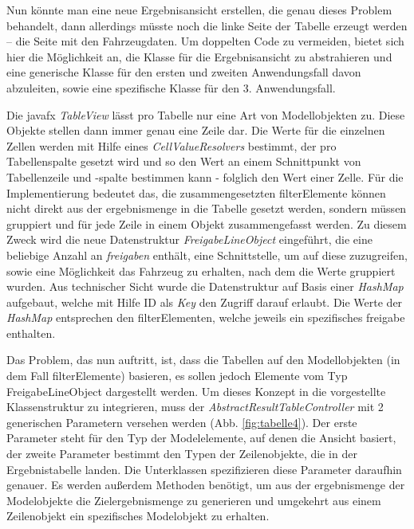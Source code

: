 Nun könnte man eine neue Ergebnisansicht erstellen, die genau dieses Problem behandelt, dann allerdings müsste noch die linke Seite der Tabelle erzeugt werden – die Seite mit den Fahrzeugdaten. Um doppelten Code zu vermeiden, bietet sich hier die Möglichkeit an, die Klasse für die Ergebnisansicht zu abstrahieren und eine generische Klasse für den ersten und zweiten Anwendungsfall davon abzuleiten, sowie eine spezifische Klasse für den 3. Anwendungsfall.

Die \gls{javafx} \textit{TableView} lässt pro Tabelle nur eine Art von Modellobjekten zu. Diese Objekte stellen dann immer genau eine Zeile dar. Die Werte für die einzelnen Zellen werden mit Hilfe eines \textit{CellValueResolvers} bestimmt, der pro Tabellenspalte gesetzt wird und so den Wert an einem Schnittpunkt von Tabellenzeile und -spalte bestimmen kann - folglich den Wert einer Zelle. Für die Implementierung bedeutet das, die zusammengesetzten \gls{filterElement}e können nicht direkt aus der \gls{ergebnismenge} in die Tabelle gesetzt werden, sondern müssen gruppiert und für jede Zeile in einem Objekt zusammengefasst werden. Zu diesem Zweck wird die neue Datenstruktur \textit{FreigabeLineObject} eingeführt, die eine beliebige Anzahl an \textit{\gls{freigabe}n} enthält, eine Schnittstelle, um auf diese zuzugreifen, sowie eine Möglichkeit das Fahrzeug zu erhalten, nach dem die Werte gruppiert wurden. Aus technischer Sicht wurde die Datenstruktur auf Basis einer \textit{HashMap} aufgebaut, welche mit Hilfe ID als \textit{Key} den Zugriff darauf erlaubt. Die Werte der \textit{HashMap} entsprechen den \gls{filterElement}en, welche jeweils ein spezifisches \gls{freigabe} enthalten.

Das Problem, das nun auftritt, ist, dass die Tabellen auf den Modellobjekten (in dem Fall \gls{filterElement}e) basieren, es sollen jedoch Elemente vom Typ FreigabeLineObject dargestellt werden. Um dieses Konzept in die vorgestellte Klassenstruktur zu integrieren, muss der \textit{AbstractResultTableController} mit 2 generischen Parametern versehen werden (Abb. \ref{fig:tabelle4}). Der erste Parameter steht für den Typ der Modelelemente, auf denen die Ansicht basiert, der zweite Parameter bestimmt den Typen der Zeilenobjekte, die in der Ergebnistabelle landen. Die Unterklassen spezifizieren diese Parameter daraufhin genauer. Es werden außerdem Methoden benötigt, um aus der \gls{ergebnismenge} der Modelobjekte die Zielergebnismenge zu generieren und umgekehrt aus einem Zeilenobjekt ein spezifisches Modelobjekt zu erhalten.

